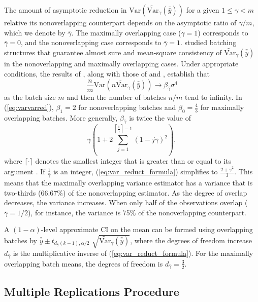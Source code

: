 \documentclass[12pt]{article}
\newcommand{\var}[1]{\mathrm{Var} \left( #1 \right)}
\newcommand{\vartg}[1]{\widetilde{\mathrm{Var}}_\gamma \left( #1 \right)}
\newcommand{\vtm}[1]{\widetilde{\mathrm{Var}}_{m} \left( #1 \right)}
\newcommand{\gammab}{\bar{\gamma}}
\newcommand{\ogb}{\tfrac{1}{\gammab}}
\newcommand{\cogb}{\left\lceil\ogb\right\rceil}
\newcommand{\yb}{\bar{y}}
\newcommand{\ybb}{\bar{\yb}}
\begin{document}
The amount of asymptotic reduction in $\var{\vartg{\ybb}}$ for a given $1\leq \gamma< m$ relative its nonoverlapping counterpart 
depends on the asymptotic ratio of $\gamma/m$, which we denote by $\gammab$. 
The maximally overlapping case ($\gamma = 1$) corresponds to $\gammab=0$, and the nonoverlapping case corresponds to $\gammab=1$. 
\cite{damerdji1994strong,damerdji1995mean} studied batching structures that guarantee almost sure and mean-square consistency of $\vartg{\ybb}$ in the nonoverlapping and maximally overlapping cases. 
Under appropriate conditions, the results of \cite{damerdji1995mean}, along with those of \cite{Meketon1984} and \cite{Welch1987}, establish that 
\begin{equation}
\label{eq:varvarred}
\frac{n}{m}\var{n \vartg{\ybb}} \rightarrow \beta_{\gammab} \sigma^4
\end{equation}
as the batch size $m$ and then the number of batches $n/m$ tend to infinity. 
In (\ref{eq:varvarred}), $\beta_1 = 2$ for nonoverlapping batches and $\beta_0 = \frac{4}{3}$ for maximally overlapping batches.  
More generally, $\beta_{\gammab}$ is twice the value of 
\begin{equation} \label{eq:var_reduct_formula}
	\gammab \left( 1 + 2 \sum_{j=1}^{\cogb-1} (1-j\gammab)^2 \right),
\end{equation}
where $\lceil \cdot \rceil$ denotes the smallest integer that is greater than or equal to its argument \citep{Welch1987}.
If $\ogb$ is an integer, (\ref{eq:var_reduct_formula}) simplifies to $\frac{2+\gammab^2}{3}$.
This means that the maximally overlapping variance estimator has a variance that is two-thirds ($66.67\%$) of the nonoverlapping estimator.
As the degree of overlap decreases, the variance increases. 
When only half of the observations overlap 
($\gammab = 1/2$),
for instance, the variance is 75\% of the nonoverlapping counterpart.


A $(1-\alpha)$-level approximate CI on the mean can be formed using overlapping batches by $\ybb \pm t_{d_{\gammab}(k-1),\alpha/2}$ $\sqrt{\vartg{\ybb}}$, where the degrees of freedom increase $d_{\gammab}$ is the multiplicative inverse of (\ref{eq:var_reduct_formula}). %
For the maximally overlapping batch means, the degrees of freedom is $d_{\gammab} = \frac{3}{2}$.

 
\subsection{Multiple Replications Procedure} 
\label{ssec:mrp}
\end{document}
